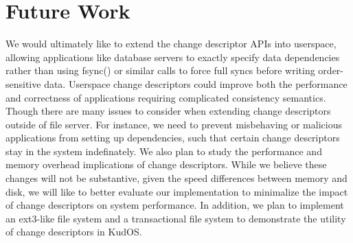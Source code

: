 \preparagraphspacing{}
\section*{Future Work}
\label{sec:future}

We would ultimately like to extend the change descriptor APIs into
userspace, allowing applications like database servers to exactly
specify data dependencies rather than using fsync() or similar calls
to force full syncs before writing order-sensitive data. Userspace
change descriptors could improve both the performance and correctness
of applications requiring complicated consistency semantics. Though
there are many issues to consider when extending change descriptors
outside of file server. For instance, we need to prevent misbehaving
or malicious applications from setting up dependencies, such that
certain change descriptors stay in the system indefinately. We also
plan to study the performance and memory overhead implications of
change descriptors. While we believe these changes will not be
substantive, given the speed differences between memory and disk,
we will like to better evaluate our implementation to minimalize the
impact of change descriptors on system performance. In addition, we
plan to implement an ext3-like file system and a transactional file
system to demonstrate the utility of change descriptors in KudOS.
